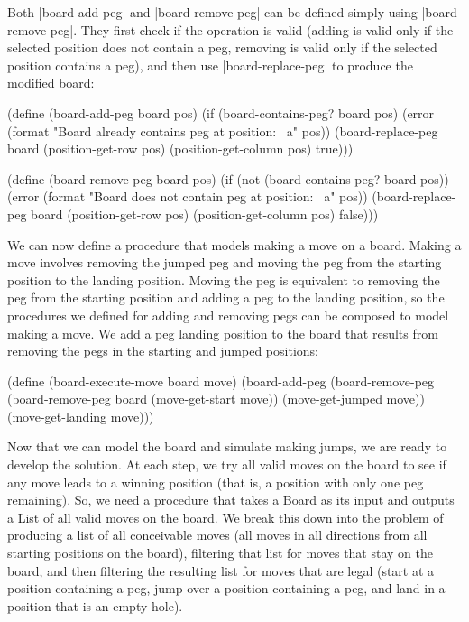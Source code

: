 \begin{schemeregion}
{Both \scheme|board-add-peg| and \scheme|board-remove-peg| can be defined simply using \scheme|board-remove-peg|.  They first check if the operation is valid (adding is valid only if the selected position does not contain a peg, removing is valid only if the selected position contains a peg), and then use \scheme|board-replace-peg| to produce the modified board:
\begin{schemedisplay}
(define (board-add-peg board pos)
  (if (board-contains-peg? board pos)
      (error (format "Board already contains peg at position: ~a" pos))
      (board-replace-peg board (position-get-row pos) 
                               (position-get-column pos) true)))

(define (board-remove-peg board pos)
  (if (not (board-contains-peg? board pos))
      (error (format "Board does not contain peg at position: ~a" pos))
      (board-replace-peg board (position-get-row pos) 
                               (position-get-column pos) false)))
\end{schemedisplay}

We can now define a procedure that models making a move on a board.  Making a move involves removing the jumped peg and moving the peg from the starting position to the landing position.  Moving the peg is equivalent to removing the peg from the starting position and adding a peg to the landing position, so the procedures we defined for adding and removing pegs can be composed to model making a move.  We add a peg landing position to the board that results from removing the pegs in the starting and jumped positions:
\begin{schemedisplay}
(define (board-execute-move board move)
  (board-add-peg 
   (board-remove-peg 
    (board-remove-peg board (move-get-start move)) 
    (move-get-jumped move))
   (move-get-landing move)))
\end{schemedisplay}

Now that we can model the board and simulate making jumps, we are ready to develop the solution.  At each step, we try all valid moves on the board to see if any move leads to a winning position (that is, a position with only one peg remaining).  So, we need a procedure that takes a Board as its input and outputs a List of all valid moves on the board.  We break this down into the problem of producing a list of all conceivable moves (all moves in all directions from all starting positions on the board), filtering that list for moves that stay on the board, and then filtering the resulting list for moves that are legal (start at a position containing a peg, jump over a position containing a peg, and land in a position that is an empty hole). 

}
\end{schemeregion}
